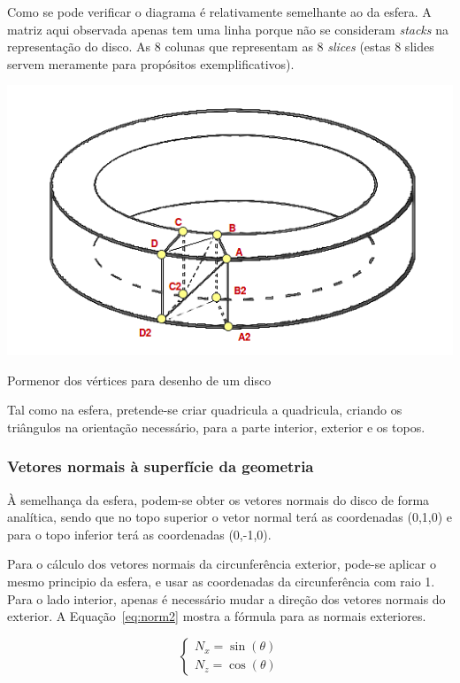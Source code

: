 Como se pode verificar o diagrama é relativamente semelhante ao da esfera.
A matriz aqui observada apenas tem uma linha porque não se consideram
\textit{stacks} na representação do disco. As 8 colunas que representam as
8 \textit{slices} (estas 8 slides servem meramente para propósitos
exemplificativos). 


\begin{center}
 	\includegraphics[width=\textwidth,height=0.5\textheight,keepaspectratio]{resources/discodiagram.png}
 	\captionsetup{type=figure, width=0.8\linewidth}
	\caption{Pormenor dos vértices para desenho de um disco}
\label{fig:sec1:disc:vertex} 
\end{center}

Tal como na esfera, pretende-se criar quadricula a quadricula, criando os
triângulos na orientação necessário, para a parte interior, exterior e os topos.


\subsubsection{Vetores normais à superfície da geometria}

À semelhança da esfera, podem-se obter os vetores normais do disco de forma
analítica, sendo que no topo superior o vetor normal terá as coordenadas (0,1,0)
e para o topo inferior terá as coordenadas (0,-1,0).

Para o cálculo dos vetores normais da circunferência exterior, pode-se aplicar
o mesmo principio da esfera, e usar as coordenadas da circunferência com raio 1. 
Para o lado interior, apenas é necessário mudar a direção dos vetores normais do
exterior. A Equação~\ref{eq:norm2} mostra a fórmula para as normais exteriores.


\begin{equation}
\begin{cases}
			N_x =  \sin(\theta) \\
	    N_z =  \cos(\theta) 
\end{cases}
\label{eq:norm2}
\end{equation}



